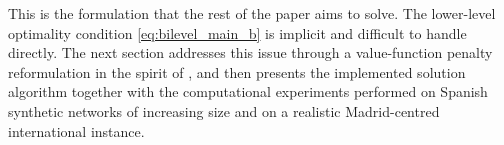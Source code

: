 This is the formulation that the rest of the paper aims to solve. The lower-level optimality condition \eqref{eq:bilevel_main_b} is implicit and difficult to handle directly. The next section addresses this issue through a value-function penalty reformulation in the spirit of \cite{Ye1997Exact,LuMei2024,Jiang2024Primal}, and then presents the implemented solution algorithm together with the computational experiments performed on Spanish synthetic networks of increasing size and on a realistic Madrid-centred international instance.
